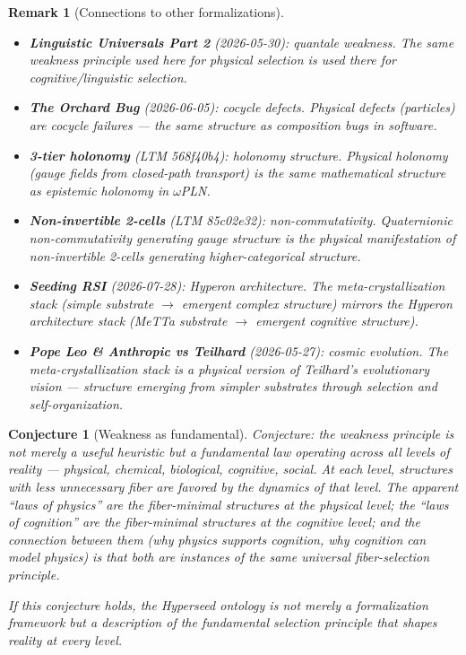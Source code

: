 \documentclass[11pt,a4paper]{article}
\newtheorem{remark}[definition]{Remark}
\newtheorem{conjecture}[definition]{Conjecture}
\begin{document}
\begin{remark}[Connections to other formalizations]
\begin{itemize}
\item \textbf{Linguistic Universals Part 2} (2026-05-30): quantale
  weakness. The same weakness principle used here for physical
  selection is used there for cognitive/linguistic selection.
\item \textbf{The Orchard Bug} (2026-06-05): cocycle defects. Physical
  defects (particles) are cocycle failures --- the same structure as
  composition bugs in software.
\item \textbf{3-tier holonomy} (LTM 568f40b4): holonomy structure.
  Physical holonomy (gauge fields from closed-path transport) is the
  same mathematical structure as epistemic holonomy in $\omega$PLN.
\item \textbf{Non-invertible 2-cells} (LTM 85c02e32): non-commutativity.
  Quaternionic non-commutativity generating gauge structure is the
  physical manifestation of non-invertible 2-cells generating
  higher-categorical structure.
\item \textbf{Seeding RSI} (2026-07-28): Hyperon architecture. The
  meta-crystallization stack (simple substrate $\to$ emergent complex
  structure) mirrors the Hyperon architecture stack (MeTTa substrate
  $\to$ emergent cognitive structure).
\item \textbf{Pope Leo \& Anthropic vs Teilhard} (2026-05-27): cosmic
  evolution. The meta-crystallization stack is a physical version of
  Teilhard's evolutionary vision --- structure emerging from simpler
  substrates through selection and self-organization.
\end{itemize}
\end{remark}

\begin{conjecture}[Weakness as fundamental]
Conjecture: the weakness principle is not merely a useful heuristic
but a fundamental law operating across all levels of reality ---
physical, chemical, biological, cognitive, social. At each level,
structures with less unnecessary fiber are favored by the dynamics
of that level. The apparent ``laws of physics'' are the fiber-minimal
structures at the physical level; the ``laws of cognition'' are the
fiber-minimal structures at the cognitive level; and the connection
between them (why physics supports cognition, why cognition can
model physics) is that both are instances of the same universal
fiber-selection principle.

If this conjecture holds, the Hyperseed ontology is not merely a
formalization framework but a description of the fundamental
selection principle that shapes reality at every level.
\end{conjecture}
\end{document}
